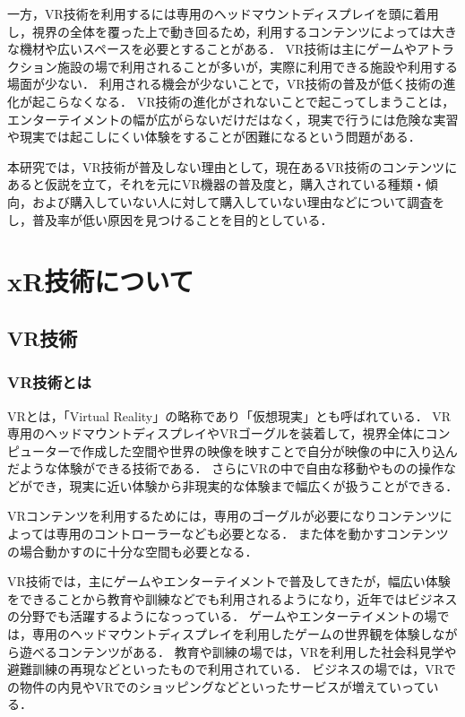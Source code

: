 \documentclass[12pt,a4j]{ltjsarticle}
\begin{document}
一方，VR技術を利用するには専用のヘッドマウントディスプレイを頭に着用し，視界の全体を覆った上で動き回るため，利用するコンテンツによっては大きな機材や広いスペースを必要とすることがある．
VR技術は主にゲームやアトラクション施設の場で利用されることが多いが，実際に利用できる施設や利用する場面が少ない．
利用される機会が少ないことで，VR技術の普及が低く技術の進化が起こらなくなる．
VR技術の進化がされないことで起こってしまうことは，エンターテイメントの幅が広がらないだけだはなく，現実で行うには危険な実習や現実では起こしにくい体験をすることが困難になるという問題がある．

本研究では，VR技術が普及しない理由として，現在あるVR技術のコンテンツにあると仮説を立て，それを元にVR機器の普及度と，購入されている種類・傾向，および購入していない人に対して購入していない理由などについて調査をし，普及率が低い原因を見つけることを目的としている．


\section{xR技術について}
\subsection{VR技術}
\subsubsection{VR技術とは}
VRとは，「Virtual Reality」の略称であり「仮想現実」とも呼ばれている．
VR専用のヘッドマウントディスプレイやVRゴーグルを装着して，視界全体にコンピューターで作成した空間や世界の映像を映すことで自分が映像の中に入り込んだような体験ができる技術である．
さらにVRの中で自由な移動やものの操作などができ，現実に近い体験から非現実的な体験まで幅広くが扱うことができる．

VRコンテンツを利用するためには，専用のゴーグルが必要になりコンテンツによっては専用のコントローラーなども必要となる．
また体を動かすコンテンツの場合動かすのに十分な空間も必要となる．

VR技術では，主にゲームやエンターテイメントで普及してきたが，幅広い体験をできることから教育や訓練などでも利用されるようになり，近年ではビジネスの分野でも活躍するようになっっている．
ゲームやエンターテイメントの場では，専用のヘッドマウントディスプレイを利用したゲームの世界観を体験しながら遊べるコンテンツがある．
教育や訓練の場では，VRを利用した社会科見学や避難訓練の再現などといったもので利用されている．
ビジネスの場では，VRでの物件の内見やVRでのショッピングなどといったサービスが増えていっている．
\end{document}
